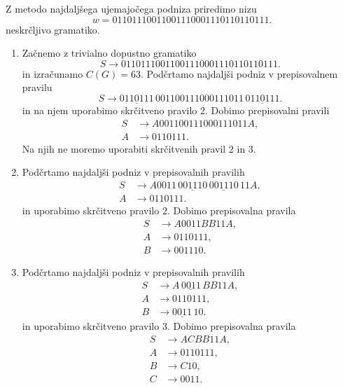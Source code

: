 \documentclass[fin1, tisk]{fmfdelo}
\theoremstyle{definition}
\begin{document}
\begin{primer}
    Z metodo najdaljšega ujemajočega podniza priredimo nizu 
    \[
        w = 01101110011001110001110110110111.
    \]
    neskrčljivo gramatiko. 
    \begin{enumerate} 
    
        \item Začnemo z trivialno dopustno gramatiko
        \[
            S \rightarrow 01101110011001110001110110110111.
        \]
        in izračunamo $C(G) = 63$. Podčrtamo najdaljši podniz v prepisovalnem pravilu
        \[
            S \rightarrow \underline{0110111} \, 001100111000111011 \, \underline{0110111}.
        \]
        in na njem uporabimo skrčitveno pravilo $2$. Dobimo prepisovalni pravili
        \begin{align*}
            S &\rightarrow A 001100111000111011 A, \\
            A &\rightarrow 0110111.
        \end{align*}
        Na njih ne moremo uporabiti skrčitvenih pravil $2$ in $3$.

        \item Podčrtamo najdaljši podniz v prepisovalnih pravilih
        \begin{align*}
            S &\rightarrow A0011 \, \underline{001110} \, \underline{001110} \, 11A, \\
            A &\rightarrow 0110111.
        \end{align*}
        in uporabimo skrčitveno pravilo $2$. Dobimo prepisovalna pravila
        \begin{align*}
            S &\rightarrow A0011BB11A, \\
            A &\rightarrow 0110111, \\
            B &\rightarrow 001110.
        \end{align*}

        \item Podčrtamo najdaljši podniz v prepisovalnih pravilih
        \begin{align*}
            S &\rightarrow A \, \underline{0011} \, BB11A, \\
            A &\rightarrow 0110111, \\
            B &\rightarrow \underline{0011} \, 10.
        \end{align*}
        in uporabimo skrčitveno pravilo $3$. Dobimo prepisovalna pravila
        \begin{align*}
            S &\rightarrow ACBB11A, \\
            A &\rightarrow 0110111, \\
            B &\rightarrow C10, \\
            C &\rightarrow 0011.
        \end{align*}
        

\end{enumerate}
\end{primer}
\end{document}
